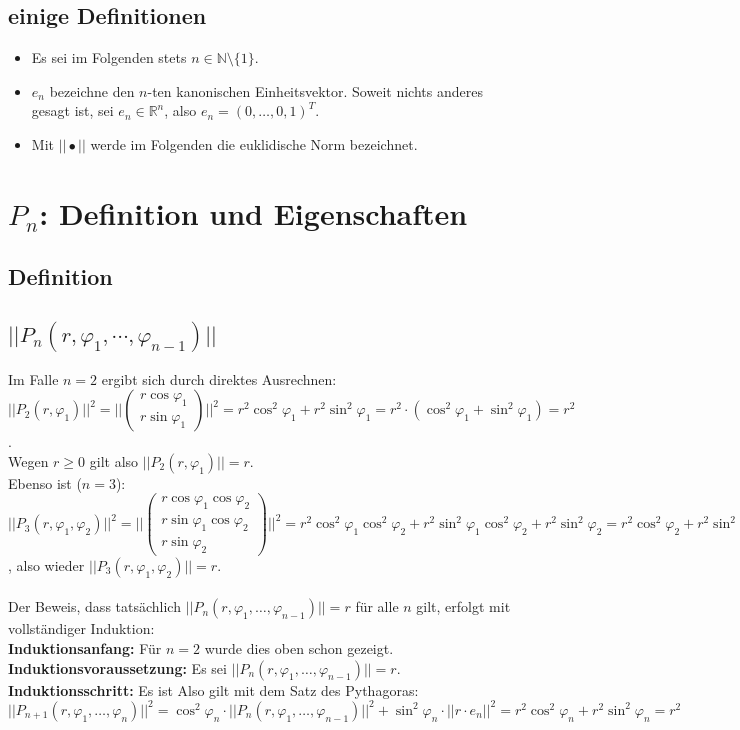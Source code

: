 \documentclass[a4paper,11pt]{report}
\theoremstyle{definition}
\newcommand{\R}{{\ensuremath{\mathbb{R}}}}
\newcommand{\N}{{\ensuremath{\mathbb{N}}}}
\begin{document}
\section{einige Definitionen}
\begin{itemize}
\item Es sei im Folgenden stets $n\in\N\setminus\{1\}$.
\item $e_n$ bezeichne den $n$-ten kanonischen Einheitsvektor. Soweit nichts anderes gesagt ist, sei $e_n\in\R^n$, also $e_n=(0,\ldots,0,1)^T$.
\item Mit $||\bullet||$ werde im Folgenden die euklidische Norm bezeichnet.
\end{itemize}
\chapter{$P_n$: Definition und Eigenschaften}
\section{Definition}
\section{$||P_n(r,\varphi_1,\cdots,\varphi_{n-1})||$}
Im Falle $n=2$ ergibt sich durch direktes Ausrechnen:\\
$||P_2(r,\varphi_1)||^2=||\begin{pmatrix}r\cos\varphi_1\\ r\sin\varphi_1\end{pmatrix}||^2=
r^2\cos^2\varphi_1+r^2\sin^2\varphi_1=r^2\cdot(\cos^2\varphi_1+\sin^2\varphi_1)=r^2$.\\
Wegen $r\geq 0$ gilt also $||P_2(r,\varphi_1)||=r$.\\
Ebenso ist ($n=3$): $||P_3(r,\varphi_1,\varphi_2)||^2=
||\begin{pmatrix}r\cos\varphi_1\cos\varphi_2\\ r\sin\varphi_1\cos\varphi_2\\ r\sin\varphi_2\end{pmatrix}||^2=
r^2\cos^2\varphi_1\cos^2\varphi_2+r^2\sin^2\varphi_1\cos^2\varphi_2+r^2\sin^2\varphi_2
=r^2\cos^2\varphi_2+r^2\sin^2\varphi_2=r^2$, also wieder $||P_3(r,\varphi_1,\varphi_2)||=r$.\\ \\
Der Beweis, dass tatsächlich $||P_n(r,\varphi_1,\ldots,\varphi_{n-1})||=r$ für alle $n$ gilt, erfolgt mit vollständiger Induktion:\\
\textbf{Induktionsanfang:} Für $n=2$ wurde dies oben schon gezeigt. \checkmark\\
\textbf{Induktionsvoraussetzung:} Es sei $||P_n(r,\varphi_1,\ldots,\varphi_{n-1})||=r$.\\
\textbf{Induktionsschritt:} Es ist %
Also gilt mit dem Satz des Pythagoras:\\
$||P_{n+1}(r,\varphi_1,\ldots,\varphi_n)||^2=\cos^2\varphi_n\cdot||P_n(r,\varphi_1,\ldots,\varphi_{n-1})||^2 +\sin^2\varphi_n\cdot||r\cdot e_n||^2=r^2\cos^2\varphi_n+r^2\sin^2\varphi_n=r^2$ \checkmark
\end{document}

